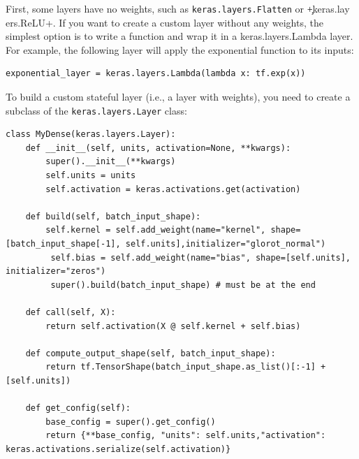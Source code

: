 \documentclass[12pt, letterpaper]{article}
\theoremstyle{definition}
\let\cd\lstinline
\begin{document}
First, some layers have no weights, such as \cd+keras.layers.Flatten+ or \c+keras.lay ers.ReLU+. If you want to create a custom layer without any weights, the simplest option is to write a function and wrap it in a keras.layers.Lambda layer. For example, the following layer will apply the exponential function to its inputs:

\begin{lstlisting}
exponential_layer = keras.layers.Lambda(lambda x: tf.exp(x))
\end{lstlisting}
To build a custom stateful layer (i.e., a layer with weights), you need to create a subclass of the \cd+keras.layers.Layer+ class:
\begin{lstlisting}
class MyDense(keras.layers.Layer):
	def __init__(self, units, activation=None, **kwargs):
		super().__init__(**kwargs)
		self.units = units
		self.activation = keras.activations.get(activation)
	
	def build(self, batch_input_shape): 
		self.kernel = self.add_weight(name="kernel", shape=[batch_input_shape[-1], self.units],initializer="glorot_normal")
         self.bias = self.add_weight(name="bias", shape=[self.units], initializer="zeros") 	
         super().build(batch_input_shape) # must be at the end

	def call(self, X):
		return self.activation(X @ self.kernel + self.bias)
	
	def compute_output_shape(self, batch_input_shape):
		return tf.TensorShape(batch_input_shape.as_list()[:-1] + [self.units])
		
	def get_config(self):
		base_config = super().get_config()
		return {**base_config, "units": self.units,"activation": keras.activations.serialize(self.activation)}
\end{lstlisting}
\end{document}
